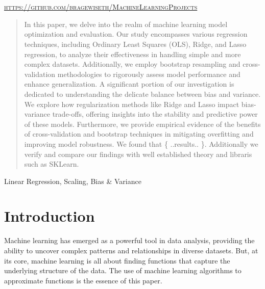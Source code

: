 \documentclass[twoside,11pt]{report}
\begin{document}
\begin{titlepage}
\begin{minipage}{0.4\textwidth}
	\end{minipage}\\[2 cm]
	\@date\\
    \vspace*{25mm}
    \textsc{\url{https://github.com/bragewiseth/MachineLearningProjects}}
	
	
    
    
    
    
	
\end{titlepage}
\nocite{*}
\newpage
\tableofcontents
\newpage

\begin{abstract}%
\lettrine{I}{}n this paper, we delve into the realm of machine learning model optimization and evaluation. 
Our study encompasses various regression techniques, including Ordinary Least Squares (OLS), Ridge, and 
Lasso regression, to analyze their effectiveness in handling simple and more complex datasets. Additionally, 
we employ bootstrap resampling and cross-validation methodologies to rigorously assess model performance 
and enhance generalization.
A significant portion of our investigation is dedicated to understanding the delicate balance between 
bias and variance. We explore how regularization methods like Ridge and Lasso impact bias-variance trade-offs, 
offering insights into the stability and predictive power of these models. Furthermore, we provide empirical 
evidence of the benefits of cross-validation and bootstrap techniques in mitigating overfitting and improving 
model robustness. We found that \{ ..results.. \}. Additionally we verify and compare our findings with well 
established theory and libraris such as SKLearn.
\end{abstract}
\begin{keywords}
    Linear Regression, Scaling, Bias \& Variance 
\end{keywords}

\section{Introduction}

Machine learning has emerged as a powerful tool in data analysis, providing the ability to uncover complex 
patterns and relationships in diverse datasets. But, at its core, machine learning is all about finding 
functions that capture the underlying structure of the data. The use of machine learning algorithms 
to approximate functions is the essence of this paper.\\
\end{document}
